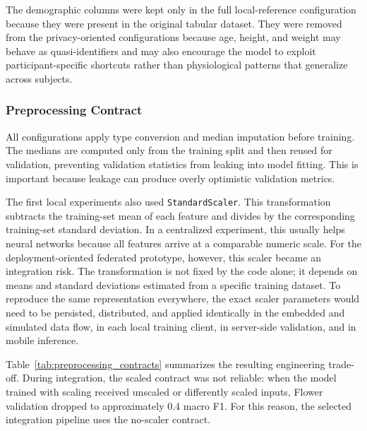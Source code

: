 \documentclass[12pt]{article}
\begin{document}
The demographic columns were kept only in the full local-reference configuration because they were present in the original tabular dataset. They were removed from the privacy-oriented configurations because age, height, and weight may behave as quasi-identifiers and may also encourage the model to exploit participant-specific shortcuts rather than physiological patterns that generalize across subjects.

\subsubsection{Preprocessing Contract}

All configurations apply type conversion and median imputation before training. The medians are computed only from the training split and then reused for validation, preventing validation statistics from leaking into model fitting. This is important because leakage can produce overly optimistic validation metrics.

The first local experiments also used \texttt{StandardScaler}. This transformation subtracts the training-set mean of each feature and divides by the corresponding training-set standard deviation. In a centralized experiment, this usually helps neural networks because all features arrive at a comparable numeric scale. For the deployment-oriented federated prototype, however, this scaler became an integration risk. The transformation is not fixed by the code alone; it depends on means and standard deviations estimated from a specific training dataset. To reproduce the same representation everywhere, the exact scaler parameters would need to be persisted, distributed, and applied identically in the embedded and simulated data flow, in each local training client, in server-side validation, and in mobile inference.

Table~\ref{tab:preprocessing_contracts} summarizes the resulting engineering trade-off. During integration, the scaled contract was not reliable: when the model trained with scaling received unscaled or differently scaled inputs, Flower validation dropped to approximately 0.4 macro F1. For this reason, the selected integration pipeline uses the no-scaler contract.
\end{document}
